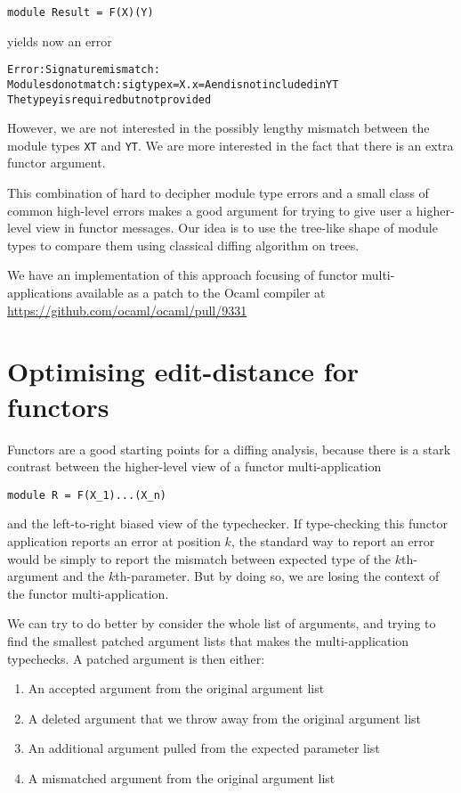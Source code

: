 \documentclass{article}
\begin{document}
\begin{verbatim}
module Result = F(X)(Y)
\end{verbatim}
yields now an error
\begin{alltt}
Error: Signature mismatch:
       Modules do not match: sig type x = X.x = A end is not included in YT
       The type y is required but not provided
\end{alltt}

However, we are not interested in the possibly lengthy mismatch between the module types \texttt{XT} and
\texttt{YT}. We are more interested in the fact that there is an extra functor argument.

This combination of hard to decipher module type errors and a small class of common high-level errors makes
a good argument for trying to give user a higher-level view in functor messages.
Our idea is to use the tree-like shape of module types to compare them using classical diffing algorithm
on trees.

We have an implementation of this approach focusing of functor multi-applications available as a patch to the
Ocaml compiler at
\url{https://github.com/ocaml/ocaml/pull/9331}


\section{Optimising edit-distance for functors}

Functors are a good starting points for a diffing analysis, because there is a
stark contrast between the higher-level view of a functor multi-application

\begin{verbatim}
module R = F(X_1)...(X_n)
\end{verbatim}

and the left-to-right biased view of the typechecker.
If type-checking this functor application reports an error at position $k$, the standard
way to report an error would be simply to report the mismatch between expected type of
the $k$th-argument and the $k$th-parameter. But by doing so, we are losing the context of the
functor multi-application.

We can try to do better by consider the whole list of arguments, and trying to find the smallest patched argument lists that makes the multi-application typechecks. A patched argument is then either:

\begin{enumerate}
\item An accepted argument from the original argument list
\item A deleted argument that we throw away from the original argument list
\item An additional argument pulled from the expected parameter list
\item A mismatched argument from the original argument list
\end{enumerate}
\end{document}
